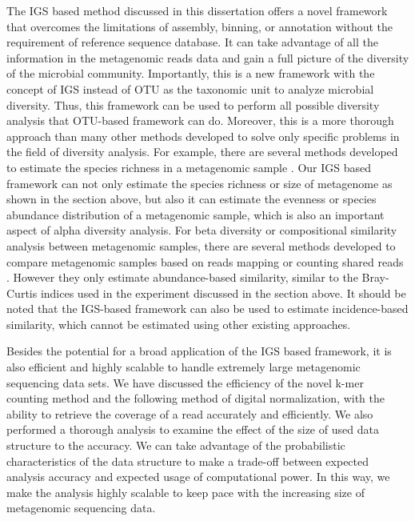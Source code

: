 The IGS based
method discussed in this dissertation offers a novel framework that
overcomes the limitations of assembly, binning, or annotation without the
requirement of reference sequence database. It can take advantage of all the 
information in the metagenomic reads data and gain a full picture of the
diversity of the microbial community. Importantly, this is a new
framework with the concept of IGS instead of OTU as the taxonomic unit to
analyze microbial diversity. Thus, this framework can be used to perform all possible
diversity analysis that OTU-based framework can do. Moreover, this is a more thorough
approach than many other methods developed to solve only specific
problems in the field of diversity analysis. For example, there are several
methods developed to estimate the species richness in a metagenomic sample 
\cite{Rodriguez-R2014}. Our IGS based framework can not only
estimate the species richness or size of metagenome as shown in the section above, but
also it can estimate the evenness or species abundance distribution of a
metagenomic sample, which is also an important aspect of alpha diversity
analysis. For beta diversity or compositional similarity analysis between
metagenomic samples, there are several methods developed to compare metagenomic
samples based on reads mapping or counting shared reads \cite{Rodriguez-R:2013aa}.
However they only estimate abundance-based similarity, similar to
the Bray-Curtis indices used in the experiment discussed in the section above.
It should be noted that the 
IGS-based framework can also be used to estimate incidence-based similarity, 
which cannot be estimated using other existing approaches.


Besides the potential for a broad application of the IGS based framework, 
it is also efficient and
highly scalable to handle extremely large metagenomic sequencing data
sets. We have discussed the efficiency of the novel k-mer counting method and
the following method of digital normalization, with the ability to retrieve the
coverage of a read accurately and efficiently. We also performed a thorough analysis
to examine the effect of the size of used data structure to the accuracy. We can take
advantage of the probabilistic characteristics of the data structure to make a
trade-off between expected analysis accuracy and expected usage of
computational power. In this way, we make the analysis highly scalable to keep
pace with the increasing size of metagenomic sequencing data.  

